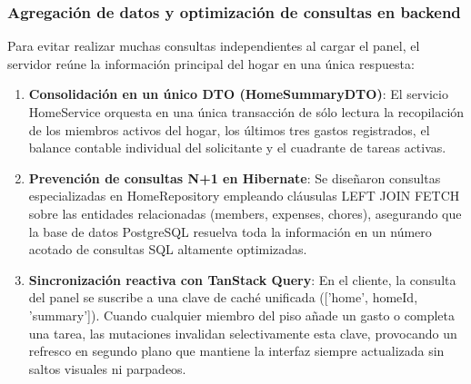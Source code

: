 \subsubsection{Agregación de datos y optimización de consultas en backend}

Para evitar realizar muchas consultas independientes al cargar el panel, el servidor reúne la información principal del hogar en una única respuesta:

\begin{enumerate}
    \item \textbf{Consolidación en un único DTO (HomeSummaryDTO)}: El servicio HomeService orquesta en una única transacción de sólo lectura la recopilación de los miembros activos del hogar, los últimos tres gastos registrados, el balance contable individual del solicitante y el cuadrante de tareas activas.
    \item \textbf{Prevención de consultas N+1 en Hibernate}: Se diseñaron consultas especializadas en HomeRepository empleando cláusulas LEFT JOIN FETCH sobre las entidades relacionadas (members, expenses, chores), asegurando que la base de datos PostgreSQL resuelva toda la información en un número acotado de consultas SQL altamente optimizadas.
    \item \textbf{Sincronización reactiva con TanStack Query}: En el cliente, la consulta del panel se suscribe a una clave de caché unificada (['home', homeId, 'summary']). Cuando cualquier miembro del piso añade un gasto o completa una tarea, las mutaciones invalidan selectivamente esta clave, provocando un refresco en segundo plano que mantiene la interfaz siempre actualizada sin saltos visuales ni parpadeos.
\end{enumerate}

